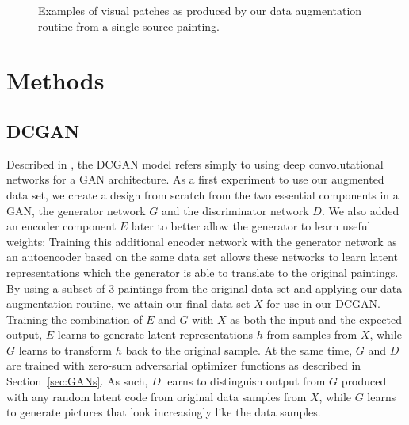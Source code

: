 \documentclass{article}
\begin{document}
\begin{figure}
    \caption{Examples of visual patches as produced by our data augmentation routine from a single source painting.}
    \label{fig:data_aug}
\end{figure}

\section{Methods}

\subsection{DCGAN}
Described in \cite{radford2015unsupervised}, the DCGAN model refers simply to using deep convolutational networks for a GAN architecture. As a first experiment to use our augmented data set, we create a design from scratch from the two essential components in a GAN, the generator network $G$ and the discriminator network $D$. We also added an encoder component $E$ later to better allow the generator to learn useful weights: Training this additional encoder network with the generator network as an autoencoder based on the same data set allows these networks to learn latent representations which the generator is able to translate to the original paintings. By using a subset of 3 paintings from the original data set and applying our data augmentation routine, we attain our final data set $X$ for use in our DCGAN. Training the combination of $E$ and $G$ with $X$ as both the input and the expected output, $E$ learns to generate latent representations $h$ from samples from $X$, while $G$ learns to transform $h$ back to the original sample. At the same time, $G$ and $D$ are trained with zero-sum adversarial optimizer functions as described in Section~\ref{sec:GANs}. As such, $D$ learns to distinguish output from $G$ produced with any random latent code from original data samples from $X$, while $G$ learns to generate pictures that look increasingly like the data samples.
\end{document}
